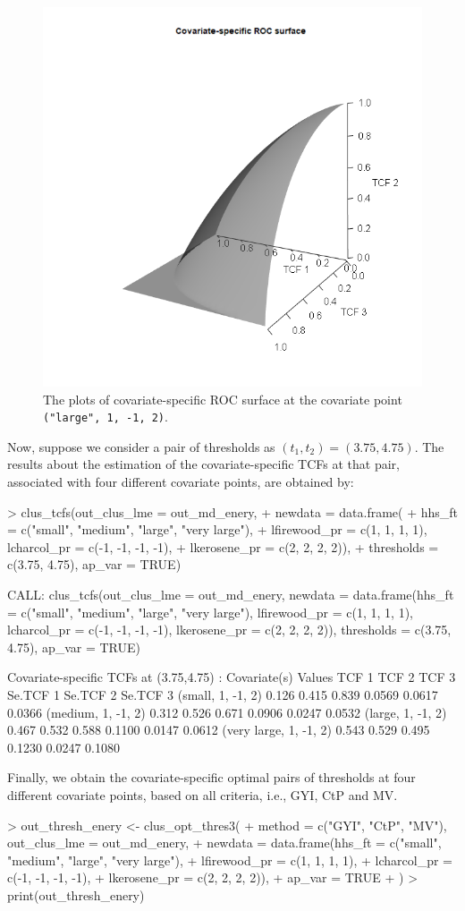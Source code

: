{\begin{figure}[htbp]
\centering 
\includegraphics[width=0.5\linewidth]{ROCS_Energy_ex1} 
\caption{The plots of covariate-specific ROC surface at the covariate point \texttt{("large", 1, -1, 2)}.}
\label{fig:ROC-surface-energy}
\end{figure}

Now, suppose we consider a pair of thresholds as $(t_1, t_2) = (3.75, 4.75)$. The results about the estimation of the covariate-specific TCFs at that pair, associated with four different covariate points, are obtained by:
\begin{example}
> clus_tcfs(out_clus_lme = out_md_enery,
+           newdata = data.frame(
+             hhs_ft = c("small", "medium", "large", "very large"), 
+             lfirewood_pr = c(1, 1, 1, 1), lcharcol_pr = c(-1, -1, -1, -1), 
+             lkerosene_pr = c(2, 2, 2, 2)),
+           thresholds = c(3.75, 4.75), ap_var = TRUE)

CALL: clus_tcfs(out_clus_lme = out_md_enery, newdata = data.frame(hhs_ft = c("small", 
    "medium", "large", "very large"), lfirewood_pr = c(1, 1, 
    1, 1), lcharcol_pr = c(-1, -1, -1, -1), lkerosene_pr = c(2, 
    2, 2, 2)), thresholds = c(3.75, 4.75), ap_var = TRUE)
 
Covariate-specific TCFs at (3.75,4.75) : 
    Covariate(s) Values TCF 1 TCF 2 TCF 3 Se.TCF 1 Se.TCF 2 Se.TCF 3
      (small, 1, -1, 2) 0.126 0.415 0.839   0.0569   0.0617   0.0366
     (medium, 1, -1, 2) 0.312 0.526 0.671   0.0906   0.0247   0.0532
      (large, 1, -1, 2) 0.467 0.532 0.588   0.1100   0.0147   0.0612
 (very large, 1, -1, 2) 0.543 0.529 0.495   0.1230   0.0247   0.1080
\end{example}

Finally, we obtain the covariate-specific optimal pairs of thresholds at four different covariate points, based on all criteria, i.e., GYI, CtP and MV.
\begin{example}
> out_thresh_enery <- clus_opt_thres3(
+   method = c("GYI", "CtP", "MV"), out_clus_lme = out_md_enery,
+   newdata = data.frame(hhs_ft = c("small", "medium", "large", "very large"), 
+                        lfirewood_pr = c(1, 1, 1, 1), 
+                        lcharcol_pr = c(-1, -1, -1, -1), 
+                        lkerosene_pr = c(2, 2, 2, 2)),
+   ap_var = TRUE
+ )
> print(out_thresh_enery)


\end{example}}
